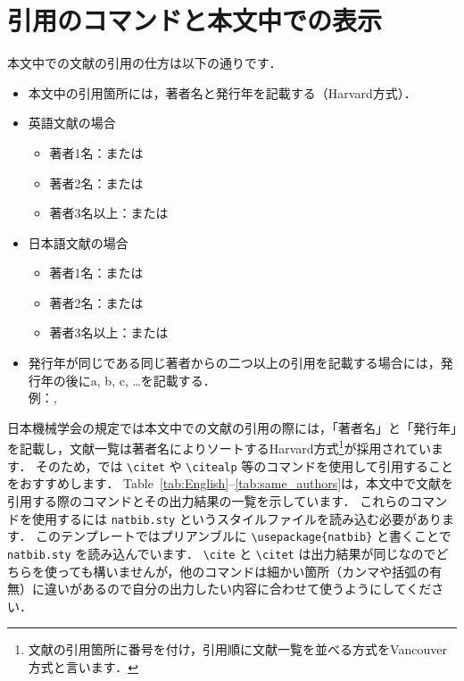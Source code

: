 \clearpage
\section{引用のコマンドと本文中での表示}
\label{sec:cite}
本文中での文献の引用の仕方は以下の通りです．
\begin{tcolorbox}[enhanced, title=\textgt{本文中での引用の仕方}, drop fuzzy shadow]
    \begin{itemize}
        \item 本文中の引用箇所には，著者名と発行年を記載する（Harvard方式）．
        \item 英語文献の場合
        \begin{itemize}
            \item 著者1名：\citet{Reynolds:PhilTransRoySoc1883}または\citep{Reynolds:PhilTransRoySoc1883}
            \item 著者2名：\citet{Schmid:Springer2001}または\citep{Schmid:Springer2001}
            \item 著者3名以上：\citet{Berghout:JFM2020}または\citep{Berghout:JFM2020}
        \end{itemize}
        \item 日本語文献の場合
        \begin{itemize}
            \item 著者1名：\citet{塚原:ながれ2023}または\citep{塚原:ながれ2023}
            \item 著者2名：\citet{塚原:ながれ2015}または\citep{塚原:ながれ2015}
            \item 著者3名以上：\citet{塚原:伝熱2007}または\citep{塚原:伝熱2007}
        \end{itemize}
        \item 発行年が同じである同じ著者からの二つ以上の引用を記載する場合には，発行年の後にa, b, c, \ldots を記載する． \\
        例：\citet{Matsukawa:ICFD2022}, \citet{松川:東北大SENAC2022}
\end{itemize}
\end{tcolorbox}

日本機械学会の規定では本文中での文献の引用の際には，「著者名」と「発行年」を記載し，文献一覧は著者名によりソートするHarvard方式\footnote{文献の引用箇所に番号を付け，引用順に文献一覧を並べる方式をVancouver方式と言います．}が採用されています．
そのため，\jsmefile では \verb|\citet| や \verb|\citealp| 等のコマンドを使用して引用することをおすすめします．
Table~\ref{tab:English}--\ref{tab:same_authors}は，本文中で文献を引用する際のコマンドとその出力結果の一覧を示しています．
これらのコマンドを使用するには \verb|natbib.sty| というスタイルファイルを読み込む必要があります．
このテンプレートではプリアンブルに \verb|\usepackage{natbib}| と書くことで \verb|natbib.sty| を読み込んでいます．
\verb|\cite| と \verb|\citet| は出力結果が同じなのでどちらを使っても構いませんが，他のコマンドは細かい箇所（カンマや括弧の有無）に違いがあるので自分の出力したい内容に合わせて使うようにしてください．


